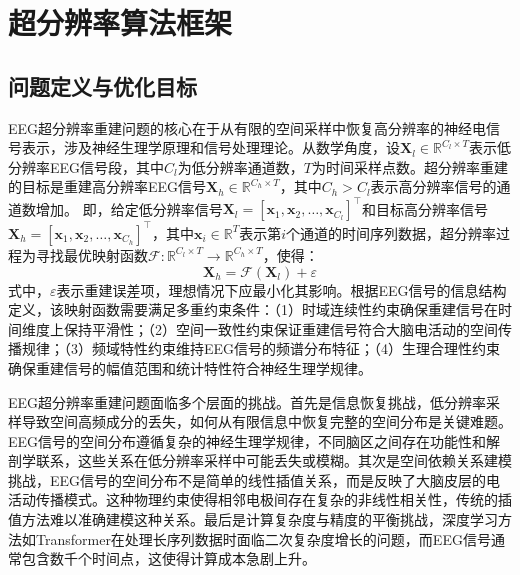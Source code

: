 \section{超分辨率算法框架}
\subsection{问题定义与优化目标}

EEG超分辨率重建问题的核心在于从有限的空间采样中恢复高分辨率的神经电信号表示，涉及神经生理学原理和信号处理理论。从数学角度，设$\mathbf{X}_l \in \mathbb{R}^{C_l \times T}$表示低分辨率EEG信号段，其中$C_l$为低分辨率通道数，$T$为时间采样点数。超分辨率重建的目标是重建高分辨率EEG信号$\mathbf{X}_h \in \mathbb{R}^{C_h \times T}$，其中$C_h > C_l$表示高分辨率信号的通道数增加。
即，给定低分辨率信号$\mathbf{X}_l = [\mathbf{x}_1, \mathbf{x}_2, \ldots, \mathbf{x}_{C_l}]^\top$和目标高分辨率信号$\mathbf{X}_h = [\mathbf{x}_1, \mathbf{x}_2, \ldots, \mathbf{x}_{C_h}]^\top$，其中$\mathbf{x}_i \in \mathbb{R}^{T}$表示第$i$个通道的时间序列数据，超分辨率过程为寻找最优映射函数$\mathcal{F}: \mathbb{R}^{C_l \times T} \rightarrow \mathbb{R}^{C_h \times T}$，使得：
\begin{equation}
\mathbf{X}_h = \mathcal{F}(\mathbf{X}_l) + \varepsilon
\label{eq:sr_mapping}
\end{equation}
式中，$\varepsilon$表示重建误差项，理想情况下应最小化其影响。根据EEG信号的信息结构定义，该映射函数需要满足多重约束条件：（1）时域连续性约束确保重建信号在时间维度上保持平滑性；（2）空间一致性约束保证重建信号符合大脑电活动的空间传播规律；（3）频域特性约束维持EEG信号的频谱分布特征；（4）生理合理性约束确保重建信号的幅值范围和统计特性符合神经生理学规律。


EEG超分辨率重建问题面临多个层面的挑战。首先是信息恢复挑战，低分辨率采样导致空间高频成分的丢失，如何从有限信息中恢复完整的空间分布是关键难题。EEG信号的空间分布遵循复杂的神经生理学规律，不同脑区之间存在功能性和解剖学联系，这些关系在低分辨率采样中可能丢失或模糊。其次是空间依赖关系建模挑战，EEG信号的空间分布不是简单的线性插值关系，而是反映了大脑皮层的电活动传播模式。这种物理约束使得相邻电极间存在复杂的非线性相关性，传统的插值方法难以准确建模这种关系。最后是计算复杂度与精度的平衡挑战，深度学习方法如Transformer在处理长序列数据时面临二次复杂度增长的问题，而EEG信号通常包含数千个时间点，这使得计算成本急剧上升。

